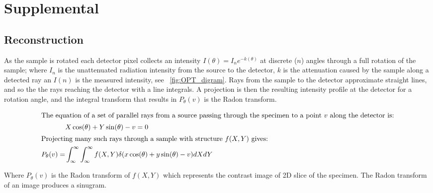 \documentclass{osa-article}
\begin{document}
\section{Supplemental}
\subsection{Reconstruction}

As the sample is rotated each detector pixel collects an intensity \(I(\theta) = I_{n}e^{-k(\theta)}\) at discrete (\(n\)) angles through a full rotation of the sample; where \(I_{n}\) is the unattenuated radiation intensity from the source to the detector, \(k\) is the attenuation caused by the sample along a detected ray an \(I(n)\) is the measured intensity, see \figurename~\ref{fig:OPT_digram}.
Rays from the sample to the detector approximate straight lines, and so the the rays reaching the detector with a line integrals.
A projection is then the resulting intensity profile at the detector for a rotation angle, and the integral transform that results in \(P_\theta(v)\)
is the Radon transform.

\begin{align}
    \intertext{The equation of a set of parallel rays from a source passing through the specimen to a point \(v\) along the detector is:}
    &X\cos(\theta) + Y\sin(\theta) - v = 0 \\
    \intertext{Projecting many such rays through a sample with structure \(f(X,Y)\) gives:}
    P_\theta(v) = &\int_{\infty}^{\infty} \int_{\infty}^{\infty} f(X,Y)\delta (x\cos(\theta)+y \sin(\theta)-v)dX dY
\end{align}


Where \(P_\theta(v)\) is the Radon transform of \(f(X,Y)\) which represents the contrast image of 2D slice of the specimen.
The Radon transform of an image produces a sinugram.%


\end{document}
